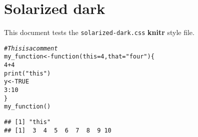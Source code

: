 \documentclass{article}\usepackage[]{graphicx}\usepackage[]{color}
\makeatletter
\newcommand{\hlnum}[1]{\textcolor[rgb]{0.827,0.212,0.51}{#1}}%
\newcommand{\hlstr}[1]{\textcolor[rgb]{0.165,0.631,0.596}{#1}}%
\newcommand{\hlcom}[1]{\textcolor[rgb]{0.345,0.431,0.459}{\textit{#1}}}%
\newcommand{\hlopt}[1]{\textcolor[rgb]{0.522,0.6,0}{#1}}%
\newcommand{\hlstd}[1]{\textcolor[rgb]{0.514,0.58,0.588}{#1}}%
\newcommand{\hlkwa}[1]{\textcolor[rgb]{0.71,0.537,0}{#1}}%
\newcommand{\hlkwb}[1]{\textcolor[rgb]{0.522,0.6,0}{#1}}%
\newcommand{\hlkwc}[1]{\textcolor[rgb]{0.514,0.58,0.588}{#1}}%
\newcommand{\hlkwd}[1]{\textcolor[rgb]{0.149,0.545,0.824}{#1}}%
\newenvironment{kframe}{%
 \def\at@end@of@kframe{}%
 \ifinner\ifhmode%
  \def\at@end@of@kframe{\end{minipage}}%
  \begin{minipage}{\columnwidth}%
 \fi\fi%
 \def\FrameCommand##1{\hskip\@totalleftmargin \hskip-\fboxsep
 \colorbox{shadecolor}{##1}\hskip-\fboxsep
     \hskip-\linewidth \hskip-\@totalleftmargin \hskip\columnwidth}%
 \MakeFramed {\advance\hsize-\width
   \@totalleftmargin\z@ \linewidth\hsize
   \@setminipage}}%
 {\par\unskip\endMakeFramed%
 \at@end@of@kframe}
\newenvironment{knitrout}{}{} %
\makeatother
\begin{document}
\section{Solarized dark}

This document tests the \texttt{solarized-dark.css} \textbf{knitr} style file.

\begin{knitrout}
\color{fgcolor}\begin{kframe}
\begin{alltt}
\hlcom{# This is a comment}
\hlstd{my_function} \hlkwb{<-} \hlkwa{function}\hlstd{(}\hlkwc{this} \hlstd{=} \hlnum{4}\hlstd{,} \hlkwc{that} \hlstd{=} \hlstr{"four"}\hlstd{) \{}
    \hlnum{4} \hlopt{+} \hlnum{4}
    \hlkwd{print}\hlstd{(}\hlstr{"this"}\hlstd{)}
    \hlstd{y} \hlkwb{<-} \hlnum{TRUE}
    \hlnum{3}\hlopt{:}\hlnum{10}
\hlstd{\}}
\hlkwd{my_function}\hlstd{()}
\end{alltt}
\begin{verbatim}
## [1] "this"
## [1]  3  4  5  6  7  8  9 10
\end{verbatim}
\end{kframe}
\end{knitrout}
\end{document}
